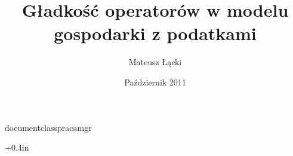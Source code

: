 documentclass{pracamgr}
\usepackage{natbib}
\usepackage{amssymb} %
\usepackage{amsmath} %
\usepackage{amsthm}  %
\usepackage[pdftex]{graphicx}
\usepackage[usenames,dvipsnames]{color} %
\usepackage[polish]{babel} %
\usepackage[utf8]{inputenc}
\usepackage[T1]{fontenc}
\usepackage{color,hyperref} %
\usepackage{graphicx, subfig} %
\usepackage{exscale,relsize}
\usepackage{pdfpages}

\hypersetup{colorlinks,breaklinks,
           linkcolor=Mahogany,urlcolor=Mahogany,
           anchorcolor=Mahogany,citecolor=Mahogany}
\hypersetup{colorlinks,breaklinks,
           linkcolor=black,urlcolor=black,
            anchorcolor=black,citecolor=black}

\label{srodowiska}
\newtheorem{tw}{Twierdzenie} 
\newtheorem{definicja}{Definicja}
\newtheorem{wn}{Wniosek}
\newtheorem{fact}{Fakt}
\newtheorem{lemat}{Lemat}
\newtheorem{ass}{Za{\l}o{\.z}enie}
\newtheorem{dowod}{Dowód}
\newtheorem{wniosek}{Wniosek}

\newcommand{\diff}[1]{\mathrm{d}\,#1}
\newcommand{\diffover}[2]{\frac{\mathrm{d}}{\mathrm{d}\,#1} #2}
\newcommand{\partialdiff}[2]{\frac{\partial}{\partial #1} #2}
\newcommand{\pardiff}[2]{\frac{\partial #1}{\partial #2}}
	
\newcommand{\brackets}[1]{[#1]}	
\newcommand{\bracketss}[2]{[#1,#2]}
\newcommand{\rbracket}{]}	

\linespread{1.3}

\author{Mateusz Łącki}
\title{Gładkość operatorów w modelu gospodarki z podatkami}	


\date{Październik 2011}



\oddsidemargin +0.4in
\evensidemargin -0.4in

